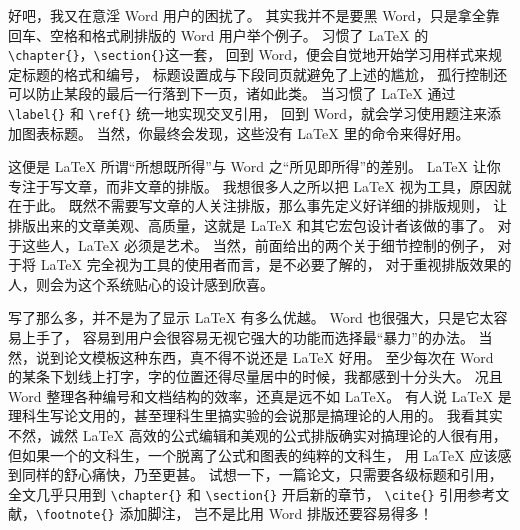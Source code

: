 好吧，我又在意淫 Word 用户的困扰了。
其实我并不是要黑 Word，只是拿全靠回车、空格和格式刷排版的 Word 用户举个例子。
习惯了 \LaTeX{} 的 \verb|\chapter{}|，\verb|\section{}|这一套，
回到 Word，便会自觉地开始学习用样式来规定标题的格式和编号，
标题设置成与下段同页就避免了上述的尴尬，
孤行控制还可以防止某段的最后一行落到下一页，诸如此类。
当习惯了 \LaTeX{} 通过 \verb|\label{}| 和 \verb|\ref{}| 统一地实现交叉引用，
回到 Word，就会学习使用题注来添加图表标题。
当然，你最终会发现，这些没有 \LaTeX{} 里的命令来得好用。

这便是 \LaTeX{} 所谓“所想既所得”与 Word 之“所见即所得”的差别。
\LaTeX{} 让你专注于写文章，而非文章的排版。
我想很多人之所以把 \LaTeX{} 视为工具，原因就在于此。
既然不需要写文章的人关注排版，那么事先定义好详细的排版规则，
让排版出来的文章美观、高质量，这就是 \LaTeX{} 和其它宏包设计者该做的事了。
对于这些人，\LaTeX{} 必须是艺术。
当然，前面给出的两个关于细节控制的例子，
对于将 \LaTeX{} 完全视为工具的使用者而言，是不必要了解的，
对于重视排版效果的人，则会为这个系统贴心的设计感到欣喜。

写了那么多，并不是为了显示 \LaTeX{} 有多么优越。
Word 也很强大，只是它太容易上手了，
容易到用户会很容易无视它强大的功能而选择最“暴力”的办法。
当然，说到论文模板这种东西，真不得不说还是 \LaTeX{} 好用。
至少每次在 Word 的某条下划线上打字，字的位置还得尽量居中的时候，我都感到十分头大。
况且 Word 整理各种编号和文档结构的效率，还真是远不如 \LaTeX{}。
有人说 \LaTeX{} 是理科生写论文用的，甚至理科生里搞实验的会说那是搞理论的人用的。
我看其实不然，诚然 \LaTeX{} 高效的公式编辑和美观的公式排版确实对搞理论的人很有用，
但如果一个的文科生，一个脱离了公式和图表的纯粹的文科生，
用 \LaTeX{} 应该感到同样的舒心痛快，乃至更甚。
试想一下，一篇论文，只需要各级标题和引用，全文几乎只用到
\verb|\chapter{}| 和 \verb|\section{}| 开启新的章节，
\verb|\cite{}| 引用参考文献，\verb|\footnote{}| 添加脚注，
岂不是比用 Word 排版还要容易得多！
